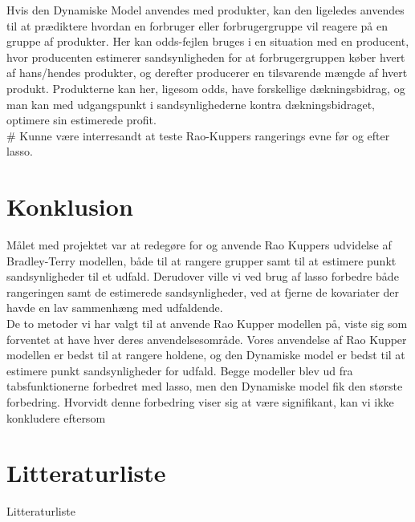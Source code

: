 \documentclass[11pt,a4paper]{article}
\begin{document}
Hvis den Dynamiske Model anvendes med produkter, kan den ligeledes anvendes til at prædiktere hvordan en forbruger eller forbrugergruppe vil reagere på en gruppe af produkter. Her kan odds-fejlen bruges i en situation med en producent, hvor producenten estimerer sandsynligheden for at forbrugergruppen køber hvert af hans/hendes produkter, og derefter producerer en tilsvarende mængde af hvert produkt. Produkterne kan her, ligesom odds, have forskellige dækningsbidrag, og man kan med udgangspunkt i sandsynlighederne kontra dækningsbidraget, optimere sin estimerede profit. \\
\# Kunne være interresandt at teste Rao-Kuppers rangerings evne før og efter lasso.
\section{Konklusion}

Målet med projektet var at redegøre for og anvende Rao Kuppers udvidelse af Bradley-Terry modellen, både til at rangere grupper samt til at estimere punkt sandsynligheder til et udfald. Derudover ville vi ved brug af lasso forbedre både rangeringen samt de estimerede sandsynligheder, ved at fjerne de kovariater der havde en lav sammenhæng med udfaldende. \\
\newline
De to metoder vi har valgt til at anvende Rao Kupper modellen på, viste sig som forventet at have hver deres anvendelsesområde. Vores anvendelse af Rao Kupper modellen er bedst til at rangere holdene, og den Dynamiske model er bedst til at estimere punkt sandsynligheder for udfald. Begge modeller blev ud fra tabsfunktionerne forbedret med lasso, men den Dynamiske model fik den største forbedring. Hvorvidt denne forbedring viser sig at være signifikant, kan vi ikke konkludere eftersom 
\clearpage
\section{Litteraturliste}
Litteraturliste
\clearpage
\end{document}
